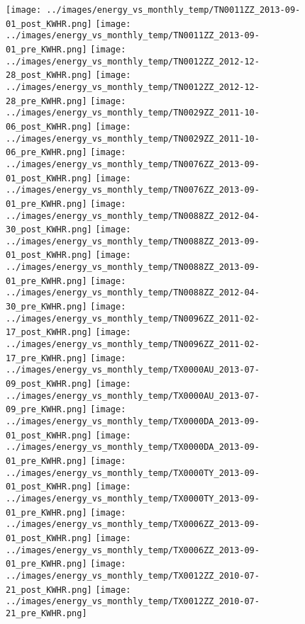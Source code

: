 \clearpage
\begin{figure}
\centering
\texttt{[image: ../images/energy\_vs\_monthly\_temp/TN0011ZZ\_2013-09-01\_post\_KWHR.png]}
\texttt{[image: ../images/energy\_vs\_monthly\_temp/TN0011ZZ\_2013-09-01\_pre\_KWHR.png]}
\texttt{[image: ../images/energy\_vs\_monthly\_temp/TN0012ZZ\_2012-12-28\_post\_KWHR.png]}
\texttt{[image: ../images/energy\_vs\_monthly\_temp/TN0012ZZ\_2012-12-28\_pre\_KWHR.png]}
\texttt{[image: ../images/energy\_vs\_monthly\_temp/TN0029ZZ\_2011-10-06\_post\_KWHR.png]}
\texttt{[image: ../images/energy\_vs\_monthly\_temp/TN0029ZZ\_2011-10-06\_pre\_KWHR.png]}
\texttt{[image: ../images/energy\_vs\_monthly\_temp/TN0076ZZ\_2013-09-01\_post\_KWHR.png]}
\texttt{[image: ../images/energy\_vs\_monthly\_temp/TN0076ZZ\_2013-09-01\_pre\_KWHR.png]}
\texttt{[image: ../images/energy\_vs\_monthly\_temp/TN0088ZZ\_2012-04-30\_post\_KWHR.png]}
\texttt{[image: ../images/energy\_vs\_monthly\_temp/TN0088ZZ\_2013-09-01\_post\_KWHR.png]}
\texttt{[image: ../images/energy\_vs\_monthly\_temp/TN0088ZZ\_2013-09-01\_pre\_KWHR.png]}
\texttt{[image: ../images/energy\_vs\_monthly\_temp/TN0088ZZ\_2012-04-30\_pre\_KWHR.png]}
\texttt{[image: ../images/energy\_vs\_monthly\_temp/TN0096ZZ\_2011-02-17\_post\_KWHR.png]}
\texttt{[image: ../images/energy\_vs\_monthly\_temp/TN0096ZZ\_2011-02-17\_pre\_KWHR.png]}
\texttt{[image: ../images/energy\_vs\_monthly\_temp/TX0000AU\_2013-07-09\_post\_KWHR.png]}
\texttt{[image: ../images/energy\_vs\_monthly\_temp/TX0000AU\_2013-07-09\_pre\_KWHR.png]}
\texttt{[image: ../images/energy\_vs\_monthly\_temp/TX0000DA\_2013-09-01\_post\_KWHR.png]}
\texttt{[image: ../images/energy\_vs\_monthly\_temp/TX0000DA\_2013-09-01\_pre\_KWHR.png]}
\texttt{[image: ../images/energy\_vs\_monthly\_temp/TX0000TY\_2013-09-01\_post\_KWHR.png]}
\texttt{[image: ../images/energy\_vs\_monthly\_temp/TX0000TY\_2013-09-01\_pre\_KWHR.png]}
\texttt{[image: ../images/energy\_vs\_monthly\_temp/TX0006ZZ\_2013-09-01\_post\_KWHR.png]}
\texttt{[image: ../images/energy\_vs\_monthly\_temp/TX0006ZZ\_2013-09-01\_pre\_KWHR.png]}
\texttt{[image: ../images/energy\_vs\_monthly\_temp/TX0012ZZ\_2010-07-21\_post\_KWHR.png]}
\texttt{[image: ../images/energy\_vs\_monthly\_temp/TX0012ZZ\_2010-07-21\_pre\_KWHR.png]}
\end{figure}
